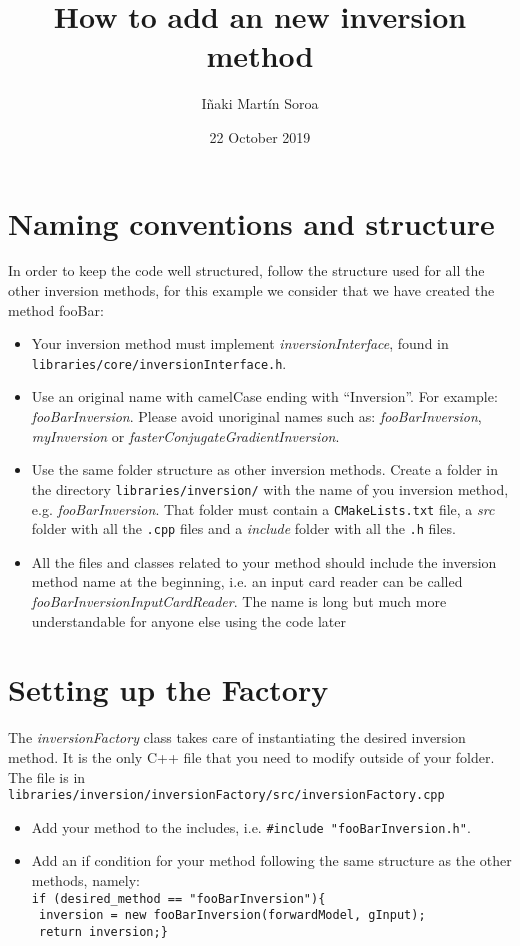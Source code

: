 \documentclass{article}
\title{How to add an new inversion method}
\author{I\~naki Mart\'in Soroa }
\date{22 October 2019}
\begin{document}
\maketitle

\section{Naming conventions and structure}
In order to keep the code well structured, follow the structure used for all the other inversion methods, for this example we consider that we have created the method fooBar:
\begin{itemize}
    \item Your inversion method must implement \textit{inversionInterface}, found in\\ \texttt{libraries/core/inversionInterface.h}.
    \item Use an original name with camelCase ending with ``Inversion''. For example: \textit{fooBarInversion}. Please avoid unoriginal names such as: \textit{fooBarInversion}, \textit{myInversion} or \textit{fasterConjugateGradientInversion}.
    \item Use the same folder structure as other inversion methods. Create a folder in the directory \texttt{libraries/inversion/} with the name of you inversion method, e.g. \textit{fooBarInversion}. That folder must contain a \texttt{CMakeLists.txt} file, a \textit{src} folder with all the \texttt{.cpp} files and a \textit{include} folder with all the \texttt{.h} files.
    \item All the files and classes related to your method should include the inversion method name at the beginning, i.e. an input card reader can be called \textit{fooBarInversionInputCardReader}. The name is long but much more understandable for anyone else using the code later
\end{itemize}

\section{Setting up the Factory}
The \textit{inversionFactory} class takes care of instantiating the desired inversion method. It is the only C++ file that you need to modify outside of your folder. The file is in\\ \texttt{libraries/inversion/inversionFactory/src/inversionFactory.cpp}
\begin{itemize}
    \item Add your method to the includes, i.e. \texttt{\#include "fooBarInversion.h"}.
    \item Add an if condition for your method following the same structure as the other methods, namely:\\\texttt{if (desired\_method == "fooBarInversion")\{}\\\texttt{    inversion = new fooBarInversion(forwardModel, gInput);}\\\texttt{    return inversion;\}}
\end{itemize}
\end{document}
